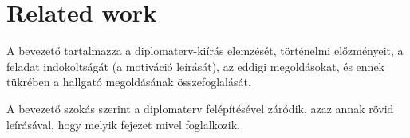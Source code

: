 \chapter{Related work}
\label{chap:relatedwork}

A bevezető tartalmazza a diplomaterv-kiírás elemzését, történelmi előzményeit, 
a feladat indokoltságát (a motiváció leírását), az eddigi megoldásokat, 
és ennek tükrében a hallgató megoldásának összefoglalását.

A bevezető szokás szerint a diplomaterv felépítésével záródik, 
azaz annak rövid leírásával, hogy melyik fejezet mivel foglalkozik.
